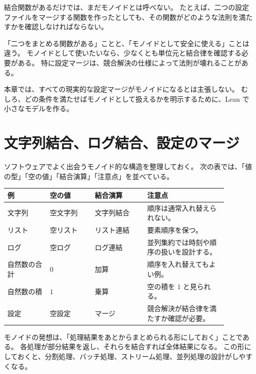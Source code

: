 結合関数があるだけでは、まだモノイドとは呼べない。
たとえば、二つの設定ファイルをマージする関数を作ったとしても、その関数がどのような法則を満たすかを確認しなければならない。

\begin{warningbox}
「二つをまとめる関数がある」ことと、「モノイドとして安全に使える」ことは違う。
モノイドとして使いたいなら、少なくとも単位元と結合律を確認する必要がある。
特に設定マージは、競合解決の仕様によって法則が壊れることがある。
\end{warningbox}

本章では、すべての現実的な設定マージがモノイドになるとは主張しない。
むしろ、どの条件を満たせばモノイドとして扱えるかを明示するために、Lean で小さなモデルを作る。

\section{文字列結合、ログ結合、設定のマージ}

ソフトウェアでよく出会うモノイド的な構造を整理しておく。
次の表では、「値の型」「空の値」「結合演算」「注意点」を並べている。

\begin{small}
\begin{longtable}{@{}p{0.17\linewidth}p{0.18\linewidth}p{0.21\linewidth}p{0.32\linewidth}@{}}
\toprule
例 & 空の値 & 結合演算 & 注意点 \\
\midrule
文字列 & 空文字列 & 文字列結合 & 順序は通常入れ替えられない。 \\
リスト & 空リスト & リスト連結 & 要素順序を保つ。 \\
ログ & 空ログ & ログ連結 & 並列集約では時刻や順序の扱いを設計する。 \\
自然数の合計 & \(0\) & 加算 & 順序を入れ替えてもよい例。 \\
自然数の積 & \(1\) & 乗算 & 空の積を \(1\) と見られる。 \\
設定 & 空設定 & マージ & 競合解決が結合律を満たすか確認が必要。 \\
\bottomrule
\end{longtable}
\end{small}

\begin{intuitionbox}
モノイドの発想は、「処理結果をあとからまとめられる形にしておく」ことである。
各処理が部分結果を返し、それらを結合すれば全体結果になる。
この形にしておくと、分割処理、バッチ処理、ストリーム処理、並列処理の設計がしやすくなる。
\end{intuitionbox}

